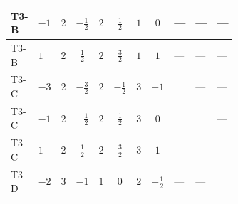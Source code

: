 \documentclass[8pt]{article}
\begin{document}
\begin{landscape}
\begin{longtable}{@{}llcccccc >{\raggedright\arraybackslash}p{0.21\linewidth} >{\raggedright\arraybackslash}p{0.21\linewidth} >{\raggedright\arraybackslash}p{0.21\linewidth}@{}}
\midrule
T3-B & $-1$ & $2$ & $-\frac{1}{2}$ & $2$ & $\frac{1}{2}$ & $1$ & $0$ & --- & --- & --- \\
\midrule
T3-B & $1$ & $2$ & $\frac{1}{2}$ & $2$ & $\frac{3}{2}$ & $1$ & $1$ & --- & --- & --- \\
\midrule
T3-C & $-3$ & $2$ & $-\frac{3}{2}$ & $2$ & $-\frac{1}{2}$ & $3$ & $-1$ & \scriptsize\adjustbox{max width=\linewidth}{$\begin{gathered} {\lambda_5} \left(\frac{3}{2} T_{\nu}^{(1)}+\frac{3}{2} T_{\nu}^{(2)}+6 \operatorname{Tr}\!\left({Y_d}\,\left({Y_d}\right)^{\dagger}\right)+2 \operatorname{Tr}\!\left({Y_e}\,\left({Y_e}\right)^{\dagger}\right)+6 \operatorname{Tr}\!\left({Y_u}\,\left({Y_u}\right)^{\dagger}\right)+\frac{{\lambda_{12}^{(A)}}}{6}+\frac{2 {\lambda_{HS_1}^{(A)}}}{3}+2 {\lambda_{HS_2}^{(A)}}\right)\end{gathered}$} & --- & --- \\
\midrule
T3-C & $-1$ & $2$ & $-\frac{1}{2}$ & $2$ & $\frac{1}{2}$ & $3$ & $0$ & \scriptsize\adjustbox{max width=\linewidth}{$\begin{gathered} {\lambda_5} \left(\frac{3}{2} T_{\nu}^{(1)}+\frac{3}{2} T_{\nu}^{(2)}+6 \operatorname{Tr}\!\left({Y_d}\,\left({Y_d}\right)^{\dagger}\right)+2 \operatorname{Tr}\!\left({Y_e}\,\left({Y_e}\right)^{\dagger}\right)+6 \operatorname{Tr}\!\left({Y_u}\,\left({Y_u}\right)^{\dagger}\right)+\frac{{\lambda_{12}^{(A)}}}{6}+\frac{2 {\lambda_{HS_1}^{(A)}}}{3}+2 {\lambda_{HS_2}^{(A)}}\right)\end{gathered}$} & \scriptsize\adjustbox{max width=\linewidth}{$\begin{gathered} -\left({\lambda_{7}}\right)^{*} \operatorname{Tr}\!\left({y_2}\,\left({y_1}\right)^{\dagger}\right)\end{gathered}$} & --- \\
\midrule
T3-C & $1$ & $2$ & $\frac{1}{2}$ & $2$ & $\frac{3}{2}$ & $3$ & $1$ & \scriptsize\adjustbox{max width=\linewidth}{$\begin{gathered} {\lambda_5} \left(\frac{3}{2} T_{\nu}^{(1)}+\frac{3}{2} T_{\nu}^{(2)}+6 \operatorname{Tr}\!\left({Y_d}\,\left({Y_d}\right)^{\dagger}\right)+2 \operatorname{Tr}\!\left({Y_e}\,\left({Y_e}\right)^{\dagger}\right)+6 \operatorname{Tr}\!\left({Y_u}\,\left({Y_u}\right)^{\dagger}\right)+\frac{{\lambda_{12}^{(A)}}}{6}+\frac{2 {\lambda_{HS_1}^{(A)}}}{3}+2 {\lambda_{HS_2}^{(A)}}\right)\end{gathered}$} & --- & --- \\
\midrule
T3-D & $-2$ & $3$ & $-1$ & $1$ & $0$ & $2$ & $-\frac{1}{2}$ & --- & --- & \scriptsize\adjustbox{max width=\linewidth}{$\begin{gathered} {\lambda_5} (T_{\nu}^{(1)}+2 T_{\nu}^{(2)}+6 \operatorname{Tr}\!\left({Y_d}\,\left({Y_d}\right)^{\dagger}\right)+2 \operatorname{Tr}\!\left({Y_e}\,\left({Y_e}\right)^{\dagger}\right)+6 \operatorname{Tr}\!\left({Y_u}\,\left({Y_u}\right)^{\dagger}\right)-4 {\lambda_{HS_1}^{(A)}})\end{gathered}$} \\

\end{longtable}
\end{landscape}
\end{document}
